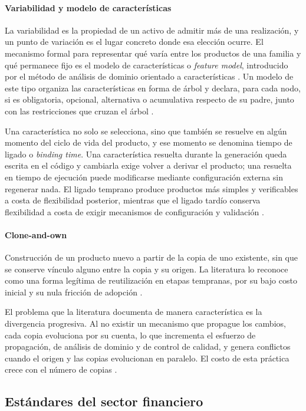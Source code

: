 \paragraph*{Variabilidad y modelo de características}
La variabilidad es la propiedad de un activo de admitir más de una realización, y un punto de variación es el lugar concreto donde esa elección ocurre. El mecanismo formal para representar qué varía entre los productos de una familia y qué permanece fijo es el modelo de características o \emph{feature model}, introducido por el método de análisis de dominio orientado a características \citep{Kang1990}. Un modelo de este tipo organiza las características en forma de árbol y declara, para cada nodo, si es obligatoria, opcional, alternativa o acumulativa respecto de su padre, junto con las restricciones que cruzan el árbol \citep{Apel2013}.

Una característica no solo se selecciona, sino que también se
resuelve en algún momento del ciclo de vida del producto, y ese
momento se denomina tiempo de ligado o \emph{binding time}. Una
característica resuelta durante la generación queda escrita en el
código y cambiarla exige volver a derivar el producto; una resuelta
en tiempo de ejecución puede modificarse mediante configuración
externa sin regenerar nada. El ligado temprano produce productos más
simples y verificables a costa de flexibilidad posterior, mientras
que el ligado tardío conserva flexibilidad a costa de exigir
mecanismos de configuración y validación \citep{Apel2013}.
\paragraph*{Clone-and-own}
Construcción de un producto nuevo a partir de la copia de uno existente, sin que se conserve vínculo alguno entre la copia y su origen. La literatura lo reconoce como una forma legítima de reutilización en etapas tempranas, por su bajo costo inicial y su nula fricción de adopción \citep{Dubinsky2013}.

El problema que la literatura documenta de manera característica es
la divergencia progresiva. Al no existir un mecanismo que propague
los cambios, cada copia evoluciona por su cuenta, lo que incrementa
el esfuerzo de propagación, de análisis de dominio y de control de
calidad, y genera conflictos cuando el origen y las copias
evolucionan en paralelo. El costo de esta práctica crece con el
número de copias \citep{Dubinsky2013}.

\subsection{Estándares del sector financiero}

